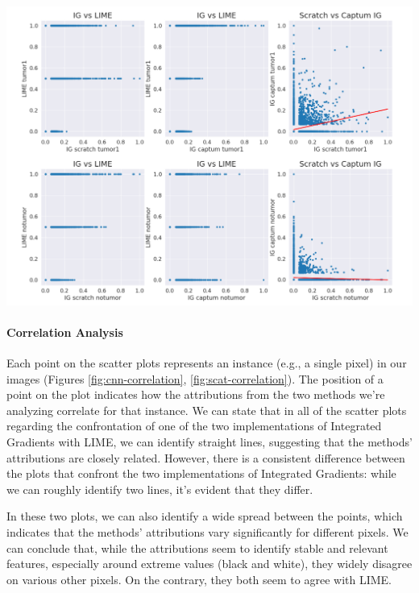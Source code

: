 \documentclass[11pt]{article}
\newenvironment{Figure}
  {\par\medskip\noindent\minipage{\linewidth}}
  {\endminipage\par\medskip}
\begin{document}
\begin{multicols*}{2}
\begin{Figure}
    \includegraphics[width=\linewidth]{images/scatnet_correlation.png}
    \label{fig:scat-correlation}
\end{Figure}


\paragraph{Correlation Analysis}
Each point on the scatter plots represents an instance (e.g., a single pixel) in our images (Figures \ref{fig:cnn-correlation}, \ref{fig:scat-correlation}). The position of a point on the plot indicates how the attributions from the two methods we're analyzing correlate for that instance. We can state that in all of the scatter plots regarding the confrontation of one of the two implementations of Integrated Gradients with LIME, we can identify straight lines, suggesting that the methods' attributions are closely related. However, there is a consistent difference between the plots that confront the two implementations of Integrated Gradients: while we can roughly identify two lines, it's evident that they differ. 

In these two plots, we can also identify a wide spread between the points, which indicates that the methods’ attributions vary significantly for different pixels. We can conclude that, while the attributions seem to identify stable and relevant features, especially around extreme values (black and white), they widely disagree on various other pixels. On the contrary, they both seem to agree with LIME.



\end{multicols*}
\end{document}
